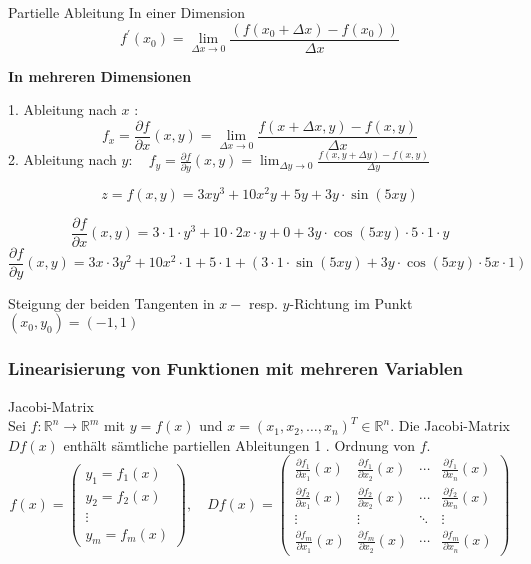 \begin{theorem}{Partielle Ableitung}
In einer Dimension
$$
f^{\prime}\left(x_0\right)=\lim _{\Delta x \rightarrow 0} \frac{\left(f\left(x_0+\Delta x\right)-f\left(x_0\right)\right)}{\Delta x}
$$

\textcolor{frog}{\textbf{In mehreren Dimensionen}}

1. Ableitung nach $x$ :
$$
f_x=\frac{\partial f}{\partial x}(x, y)=\lim _{\Delta x \rightarrow 0} \frac{f(x+\Delta x, y)-f(x, y)}{\Delta x}
$$
2. Ableitung nach $y: \quad f_y=\frac{\partial f}{\partial y}(x, y)=\lim _{\Delta y \rightarrow 0} \frac{f(x, y+\Delta y)-f(x, y)}{\Delta y}$
\end{theorem}

\begin{example}
$$
z=f(x, y)=3 x y^3+10 x^2 y+5 y+3 y \cdot \sin (5 x y)
$$

$$\frac{\partial f}{\partial x}(x, y)=3 \cdot 1 \cdot y^3+10 \cdot 2 x \cdot y+0+3 y \cdot \cos (5 x y) \cdot 5 \cdot 1 \cdot y$$
$$\frac{\partial f}{\partial y}(x, y)=3 x \cdot 3 y^2+10 x^2 \cdot 1+5 \cdot 1+(3 \cdot 1 \cdot \sin (5 x y)+3 y \cdot \cos (5 x y) \cdot 5 x \cdot 1)$$

Steigung der beiden Tangenten in $x-$ resp. $y$-Richtung im Punkt $\left(x_0, y_0\right)=(-1,1)$
\end{example}

\subsubsection{Linearisierung von Funktionen mit mehreren Variablen}

\begin{concept}{Jacobi-Matrix}\\
    Sei $f: \mathbb{R}^n \rightarrow \mathbb{R}^m$ mit $y=f(x)$ und $x=\left(x_1, x_2, \ldots, x_n\right)^T \in \mathbb{R}^n$. Die Jacobi-Matrix $D f(x)$ enthält sämtliche partiellen Ableitungen 1 . Ordnung von $f$.
    $$
    f(x)=\left(\begin{array}{c}
    y_1=f_1(x) \\
    y_2=f_2(x) \\
    \vdots \\
    y_m=f_m(x)
    \end{array}\right), \quad D f(x)=\left(\begin{array}{cllc}
    \frac{\partial f_1}{\partial x_1}(x) & \frac{\partial f_1}{\partial x_2}(x) & \cdots & \frac{\partial f_1}{\partial x_n}(x) \\
    \frac{\partial f_2}{\partial x_1}(x) & \frac{\partial f_2}{\partial x_2}(x) & \cdots & \frac{\partial f_2}{\partial x_n}(x) \\
    \vdots & \vdots & \ddots & \vdots \\
    \frac{\partial f_m}{\partial x_1}(x) & \frac{\partial f_m}{\partial x_2}(x) & \cdots & \frac{\partial f_m}{\partial x_n}(x)
    \end{array}\right)
    $$
\end{concept}


